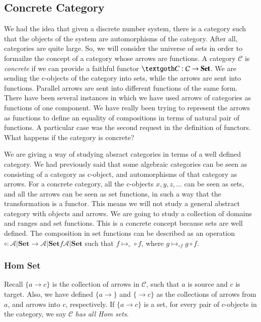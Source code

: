 \documentclass [12pt]{book}
\begin{document}
		\subsection{Concrete Category}

We had the idea that given a discrete number system, there is a category such that the objects of the system are automorphisms of the category. After all, categories are quite large. So, we will consider the universe of sets in order to formailze the concept of a category whose arrows are functions. A category $\mathcal C$ is \textit{concrete} if we can provide a faithful functor $\textgoth C:\mathcal C\rightarrow\textbf{Set}$. We are sending the c-objects of the category into sets, while the arrows are sent into functions. Parallel arrows are sent into different functions of the same form. There have been several instances in which we have used arrows of categories as functions of one component. We have really been trying to represent the arrows as functions to define an equality of compositions in terms of natural pair of functions. A particular case was the second request in the definition of functors. What happens if the category is concrete?

We are giving a way of studying absract categories in terms of a well defined category. We had previously said that some algebraic categories can be seen as consisting of a category as c-object, and automorphisms of that category as arrows. For a concrete category, all the c-objects $x,y,z,...$ can be seen as sets, and all the arrows can be seen as set functions, in such a way that the transformation is a functor. This means we will not study a general abstract category with objects and arrows. We are going to study a collection of domains and ranges and set functions. This is a concrete concept because sets are well defined. The composition in set functions can be described as an operation $\circ:\mathcal A|\textbf{Set}\rightarrow\mathcal A|\textbf{Set}f\mathcal A|\textbf{Set}$ such that $f\mapsto_\circ\circ f$, where $g\mapsto_{\circ f}g\circ f$.

\subsubsection{Hom Set}Recall $\{a\rightarrow c\}$ is the collection of arrows in $\mathcal C$, such that $a$ is source and $c$ is target. Also, we have defined $\{a\rightarrow\}$ and $\{ 			\rightarrow c\}$ as the collections of arrows from $a$, and arrows into $c$, respectively. If $\{a\rightarrow c\}$ is a set, for every pair of c-objects in the category, we say $\mathcal C$ \textit{has all Hom sets}.
\end{document}
